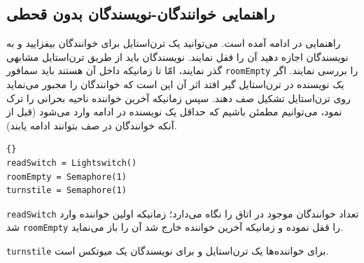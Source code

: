 \documentclass{book}
\newcommand{\clearemptydoublepage}{\newpage\cleardoublepage}
\begin{document}
\clearemptydoublepage
\subsection {راهنمایی خوانندگان-نویسندگان بدون قحطی}  

    راهنمایی در ادامه آمده است. می‌توانید یک ترن‌استایل برای خوانندگان بیفزایید و به نویسندگان اجازه دهید آن را قفل نمایند. 
    نویسندگان باید از طریق ترن‌استایل مشابهی گذر نمایند، امّا تا زمانیکه داخل آن هستند باید سمافور {\tt roomEmpty} را بررسی نمایند. 
    اگر یک نویسنده در ترن‌استایل گیر افتد اثر آن این است که خوانندگان را مجبور می‌نماید روی ترن‌استایل تشکیل صف دهند. سپس زمانیکه آخرین 
    خواننده ناحیه بحرانی را ترک نمود، می‌توانیم مطمئن باشیم که حداقل یک نویسنده در ادامه وارد می‌شود (قبل از آنکه خوانندگان در صف بتوانند ادامه یابند).

\begin{latin}
\begin{latin}
\begin{lstlisting}[title=\rl{مقدار دهی اولیه خوانندگان-نویسندگان بدون قحطی}]{}
readSwitch = Lightswitch()
roomEmpty = Semaphore(1)
turnstile = Semaphore(1)
\end{lstlisting}
\end{latin}
\end{latin}

    {\tt readSwitch} 
    تعداد خوانندگان موجود در اتاق را نگاه می‌دارد؛ زمانیکه اولین خواننده وارد شد  {\tt roomEmpty} را قفل نموده و زمانیکه آخرین خواننده خارج شد 
    آن را باز می‌نماید. 

    {\tt turnstile}
    برای خواننده‌ها یک ترن‌استایل  و برای نویسندگان یک میوتکس است. 
\end{document}
